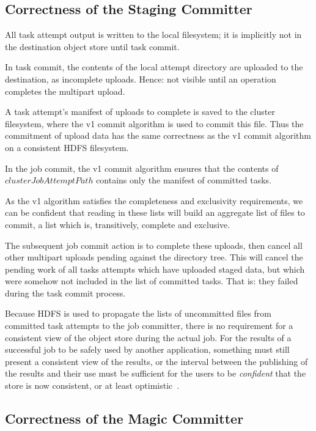 \documentclass[conference]{IEEEtran}
\begin{document}
\subsection{Correctness of the Staging Committer}

All task attempt output is written to the local filesystem;
it is implicitly not in the destination object store until task commit.

In task commit, the contents of the local attempt directory are uploaded to the
destination, as incomplete uploads.
Hence: not visible until an operation completes the multipart upload.

A task attempt's manifest of uploads to complete is saved to the cluster filesystem,
where the v1 commit algorithm is used to commit this file.
Thus the commitment of upload data has the same correctness as the
v1 commit algorithm on a consistent HDFS filesystem.

In the job commit, the v1 commit algorithm ensures that the contents
of $clusterJobAttemptPath$ contains only the manifest of committed tasks.

As the v1 algorithm satisfies the completeness and exclusivity requirements,
we can be confident that reading in these lists will build an aggregate list
of files to commit, a list which is, transitively, complete and exclusive.

The subsequent job commit action is to complete these uploads,
then cancel all other multipart uploads pending against the directory tree.
This will cancel the pending work of all tasks attempts which have uploaded staged
data, but which were somehow not included in the list of committed tasks.
That is: they failed during the task commit process.

Because HDFS is used to propagate the lists of uncommitted files from
committed task attempts to the job committer, there is no requirement for
a consistent view of the object store during the actual job.
For the results of a successful job to be safely used by another application,
something must still present a consistent view of the results, or
the interval between the publishing of the results and their use must be sufficient
for the users to be \emph{confident} that the store is now consistent,
or at least optimistic\ \cite{Bermbach:2014:BEC:2624303.2624662}.



\subsection{Correctness of the Magic Committer}
\end{document}
